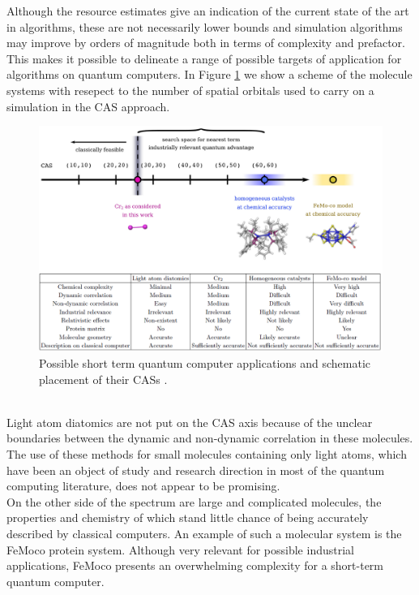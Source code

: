 Although the resource estimates give an indication of the current state of the art in algorithms, these are not necessarily lower bounds and simulation algorithms may improve by orders of magnitude both in terms of complexity and prefactor. \\
This makes it possible to delineate a range of possible targets of application for algorithms on quantum computers. In Figure \ref{Targets of simulation} we show a scheme of the molecule systems with resepect to the number of spatial orbitals used to carry on a simulation in the CAS approach. \\
\begin{figure}[ht]
  \centering
  \includegraphics[width=\textwidth]{figures/Targets of simulation.png}
  \caption{Possible short term quantum computer applications and schematic placement of their CASs \cite{Elfving2020Sep}.} \label{Targets of simulation}
\end{figure} \\
Light atom diatomics are not put on the CAS axis because of the unclear boundaries between the dynamic and non-dynamic correlation in these molecules. The use of these methods for small molecules containing only light atoms, which have been an object of study and research direction in most of the quantum computing literature, does not appear to be promising. \\
On the other side of the spectrum are large and complicated molecules, the properties and chemistry of which stand little chance of being accurately described by classical computers. An example of such a molecular system is the FeMoco protein system. Although very relevant for possible industrial applications, FeMoco presents an overwhelming complexity for a short-term quantum computer. \\
